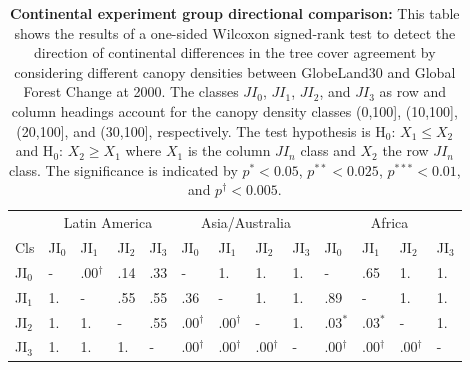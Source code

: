 			\begin{table}[ht]
				\centering
				\caption[Continental experiment group directional comparison]{\textbf{Continental experiment group directional comparison:} This table shows the results of a one-sided Wilcoxon signed-rank test to detect the direction of continental differences in the tree cover agreement by considering different canopy densities between GlobeLand30 and Global Forest Change at 2000. The classes $JI_0$, $JI_1$, $JI_2$, and $JI_3$ as row and column headings account for the canopy density classes (0,100], (10,100], (20,100], and (30,100], respectively. The test hypothesis is H$_0$: $X_1\leq X_2$ and H$_0$: $X_2\geq X_1$ where $X_1$ is the column $JI_n$ class and $X_2$ the row $JI_n$ class. The significance is indicated by $p^{*}<0.05$, $p^{**}<0.025$, $p^{***}<0.01$, and $p^{\dagger}<0.005$.}
				\label{tab:wilcoxononesided_regions}
				\begin{tabular}{lllllllllllll}
					\hline
					& \multicolumn{4}{|c}{Latin America} & \multicolumn{4}{|c|}{Asia/Australia} & \multicolumn{4}{c|}{Africa} \\
					Cls & JI$_0$ & JI$_1$ & JI$_2$ & JI$_3$ & JI$_0$ & JI$_1$ & JI$_2$ & JI$_3$ & JI$_0$ & JI$_1$ & JI$_2$ & JI$_3$ \\\hline
					JI$_0$ & - & .00$^{\dagger}$ & .14 & .33 & - & 1. & 1. & 1. & - & .65 & 1. & 1. \\
					JI$_1$ & 1. & - & .55 & .55 & .36 & - & 1. & 1. & .89 & - & 1. & 1. \\
					JI$_2$ & 1. & 1. & - & .55 & .00$^{\dagger}$ & .00$^{\dagger}$ & - & 1. & .03$^{*}$ & .03$^{*}$ & - & 1. \\
					JI$_3$ & 1. & 1. & 1. & - & .00$^{\dagger}$ & .00$^{\dagger}$ & .00$^{\dagger}$ & - & .00$^{\dagger}$ & .00$^{\dagger}$ & .00$^{\dagger}$ & - \\\hline
				\end{tabular}
			\end{table}


